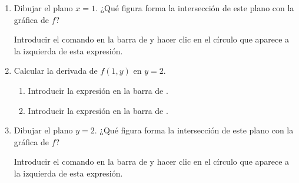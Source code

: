 \begin{enumerate}[leftmargin=*]
\begin{enumerate}
\begin{indication}
            \end{indication}


      \item Dibujar el plano $x=1$. ¿Qué figura forma la intersección de este plano con la gráfica de $f$?
            \begin{indication}
            Introducir el comando  en la barra de  y hacer clic en el círculo que aparece a la izquierda de esta expresión.
            \end{indication}

      \item Calcular la derivada de $f(1,y)$ en $y=2$.
            \begin{indication}
            \begin{enumerate}
            \item Introducir la expresión  en la barra de .
            \item Introducir la expresión  en la barra de .
            \end{enumerate}
            \end{indication}

      \item Dibujar el plano $y=2$. ¿Qué figura forma la intersección de este plano con la gráfica de $f$?
            \begin{indication}
            Introducir el comando  en la barra de  y hacer clic en el círculo que aparece a la izquierda de esta expresión.
            \end{indication}


\end{enumerate}
\end{enumerate}
